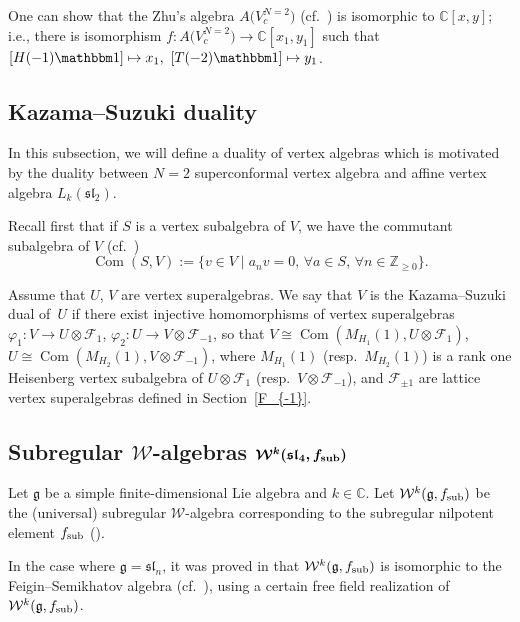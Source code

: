 \documentclass[11pt]{article}
\numberwithin{equation}{section}
\newcommand{\Z}{\mathbb Z}
\newcommand{\F}{\mathcal F}
\begin{document}
 One can show that the Zhu's algebra $A\bigl(V^{N=2}_{c}\bigr)$ (cf.\ \cite{A-IMRN}) is isomorphic to ${\mathbb C}[x,y]$; i.e., there is isomorphism $f \colon A\bigl(V^{N=2}_{c}\bigr) \rightarrow {\mathbb C}[x_1,y_1]$ such that
$[H({-1}){\mathbbm 1}] \mapsto x_1, \ [T({-2}{)\mathbbm 1}] \mapsto y_1$.

\subsection{Kazama--Suzuki duality}
In this subsection, we will define a duality of vertex algebras which is motivated by the duality between $N=2$ superconformal vertex algebra and affine vertex algebra $L_k(\mathfrak{sl}_2)$.

Recall first that if $S$ is a vertex subalgebra of $V$, we have the commutant subalgebra of $V$ (cf.\ \cite{LL})
\[
\operatorname{Com} (S, V):= \{ v \in V \mid a_n v = 0,\, \forall a \in S,\, \forall n \in {\Z}_{\ge 0}\}.
\]

Assume that $U$, $V$ are vertex superalgebras. We say that $V$ is the Kazama--Suzuki dual of~$U$ if there exist injective homomorphisms of vertex superalgebras
$
 \varphi_1 \colon V \rightarrow U \otimes \F_1$, $ \varphi_2 \colon U \rightarrow V \otimes \F_{-1}$,
so that
$
V \cong \operatorname{Com} \left( M_{H_1} (1), U \otimes \F_1\right)$, $ U \cong \operatorname{Com} \left( M_{H_2} (1), V \otimes \F_{-1}\right)$,
where $M_{H_1} (1) $ (resp.\ $ M_{H_2} (1)$) is a rank one Heisenberg vertex subalgebra of
$U\otimes \F_1$ (resp.\ $V\otimes \F_{-1}$), and $\F_{\pm 1}$ are lattice vertex superalgebras defined in Section~\ref{F_{-1}}.

\subsection[Subregular W-algebras W\^{}k(sl\_4, f\_sub]{Subregular $\boldsymbol{\mathcal{W}}$-algebras $\boldsymbol{\mathcal{W}^k(\mathfrak{sl}_4, f_{\rm sub})}$}	\label{subreg_ope}

Let $\mathfrak{g}$ be a simple finite-dimensional Lie algebra and $k \in \mathbb{C}$. Let $\mathcal{W}^k(\mathfrak{g}, f_{\rm sub})$ be the (universal) subregular $\mathcal{W}$-algebra corresponding to the subregular nilpotent element $f_{\rm sub}$ (\cite{KW}).

In the case where $\mathfrak g = \mathfrak{sl}_n$, it was proved in \cite{Gen} that $\mathcal{W}^k(\mathfrak{g}, f_{\rm sub})$ is isomorphic to the Feigin--Semikhatov algebra  (cf.\ \cite{FS}), using a certain free field realization of $\mathcal{W}^k(\mathfrak{g}, f_{\rm sub})$.
\end{document}
